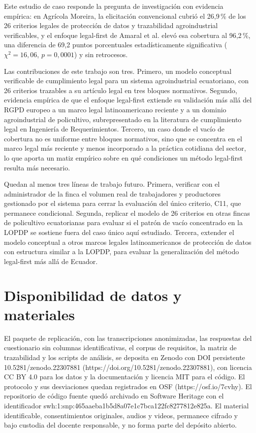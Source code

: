 \documentclass[pdflatex,sn-mathphys-num]{sn-jnl}
\begin{document}
Este estudio de caso responde la pregunta de investigaci\'on con evidencia emp\'irica: en Agr\'icola Moreira, la elicitaci\'on convencional cubri\'o el 26,9\,\% de los 26 criterios legales de protecci\'on de datos y trazabilidad agroindustrial verificables, y el enfoque legal-first de Amaral et al. \cite{amaral2021} elev\'o esa cobertura al 96,2\,\%, una diferencia de 69,2 puntos porcentuales estad\'isticamente significativa ($\chi^2=16,06$, $p=0,0001$) y sin retrocesos.

Las contribuciones de este trabajo son tres. Primero, un modelo conceptual verificable de cumplimiento legal para un sistema agroindustrial ecuatoriano, con 26 criterios trazables a su art\'iculo legal en tres bloques normativos. Segundo, evidencia emp\'irica de que el enfoque legal-first extiende su validaci\'on m\'as all\'a del RGPD europeo a un marco legal latinoamericano reciente y a un dominio agroindustrial de policultivo, subrepresentado en la literatura de cumplimiento legal en Ingenier\'ia de Requerimientos. Tercero, un caso donde el vac\'io de cobertura no es uniforme entre bloques normativos, sino que se concentra en el marco legal m\'as reciente y menos incorporado a la pr\'actica cotidiana del sector, lo que aporta un matiz emp\'irico sobre en qu\'e condiciones un m\'etodo legal-first resulta m\'as necesario.

Quedan al menos tres l\'ineas de trabajo futuro. Primera, verificar con el administrador de la finca el volumen real de trabajadores y productores gestionado por el sistema para cerrar la evaluaci\'on del \'unico criterio, C11, que permanece condicional. Segunda, replicar el modelo de 26 criterios en otras fincas de policultivo ecuatorianas para evaluar si el patr\'on de vac\'io concentrado en la LOPDP se sostiene fuera del caso \'unico aqu\'i estudiado. Tercera, extender el modelo conceptual a otros marcos legales latinoamericanos de protecci\'on de datos con estructura similar a la LOPDP, para evaluar la generalizaci\'on del m\'etodo legal-first m\'as all\'a de Ecuador.

\backmatter

\section*{Disponibilidad de datos y materiales}

El paquete de replicación, con las transcripciones anonimizadas, las respuestas del cuestionario sin columnas identificativas, el corpus de requisitos, la matriz de trazabilidad y los scripts de análisis, se deposita en Zenodo con DOI persistente 10.5281/zenodo.22307881 (https://doi.org/10.5281/zenodo.22307881), con licencia CC BY 4.0 para los datos y la documentación y licencia MIT para el código. El protocolo y sus desviaciones quedan registrados en OSF (https://osf.io/7cvhy). El repositorio de código fuente quedó archivado en Software Heritage con el identificador swh:1:snp:465aaeba1b5d8a07e1c7bca122fc8277812e825a. El material identificable, consentimientos originales, audios y videos, permanece cifrado y bajo custodia del docente responsable, y no forma parte del depósito abierto.
\end{document}
